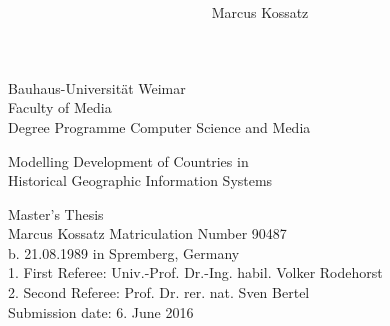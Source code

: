 \documentclass[11pt, a4paper]{report}
\title{\titleFirst \\ \titleSecond}
\author{Marcus Kossatz}
\date{\submissionDate}
\newcommand{\titleFirst}  {Modelling Development of Countries in}
\newcommand{\titleSecond} {Historical Geographic Information Systems}
\newcommand{\submissionDate}{6. June 2016}
\begin{document}

\begin{titlepage}

Bauhaus-Universität Weimar \\
Faculty of Media \\
Degree Programme Computer Science and Media \\ [2.0cm]

\begin{center}

{\huge \titleFirst} \\[0.5cm]
{\huge \titleSecond} \\[3.5cm]
\end{center}

{\LARGE Master's Thesis} \\[1.0cm]

Marcus Kossatz \hfill Matriculation Number 90487 \\
b. 21.08.1989 in Spremberg, Germany \\

1. First Referee: Univ.-Prof. Dr.-Ing. habil. Volker Rodehorst \\
2. Second Referee: Prof. Dr. rer. nat. Sven Bertel \\

\vfill
Submission date: \submissionDate

\end{titlepage}



\tableofcontents

\listoffigures
\listoftables

















{}





\end{document}
